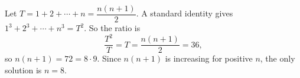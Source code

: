 Let $T=1+2+\cdots+n=\dfrac{n(n+1)}{2}$. A standard identity gives $1^3+2^3+\cdots+n^3=T^2$. So the ratio is
\[\dfrac{T^2}{T}=T=\dfrac{n(n+1)}{2}=36,\]
so $n(n+1)=72=8\cdot9$. Since $n(n+1)$ is increasing for positive $n$, the only solution is $n=\boxed{8}$.
